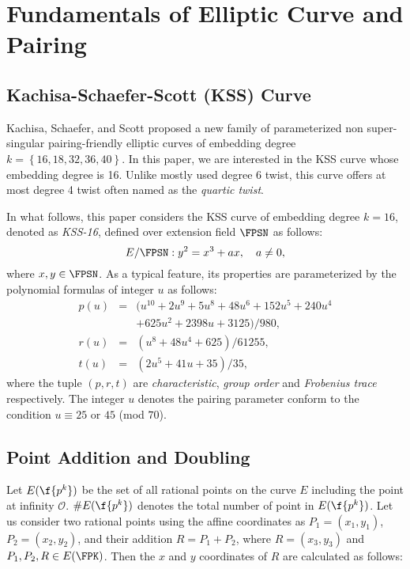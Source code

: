 \section{Fundamentals of Elliptic Curve and Pairing}\label{sec:1}
\subsection{Kachisa-Schaefer-Scott (KSS) Curve \cite{kss}}
Kachisa, Schaefer, and Scott proposed a new family of  parameterized non super-singular pairing-friendly elliptic curves of embedding degree $k = \left\lbrace 16, 18, 32, 36, 40\right\rbrace$.
In this paper, we are interested in the KSS curve whose embedding degree is 16. 
Unlike mostly used degree 6 twist, this curve offers at most degree 4 twist often named as the \textit{quartic twist}.

In what follows, this paper considers  the KSS curve of embedding degree $k =16$, denoted as \textit{KSS-16}, defined over extension field $\FPSN$ as follows:
\begin{equation}\label{eq:KSS_16}
E/\FPSN:y^2=x^3+ax, \quad \mbox{$a \neq 0$},
\end{equation}
where $x,y \in \FPSN$. 
As a typical feature, its properties are parameterized by the polynomial formulas of integer $u$ as follows:
\begin{subequations}
	\begin{eqnarray}
	p(u) &= & (u^{10} +2u^9 +5u^8 +48u^6 +152u^5 +240u^4   \nonumber \\ 
	&& +625u^2 +2398u +3125)/980,  \\\label{eq:kss_16_char}
	r(u) &= & (u^8 +48u^4 +625)/61255, \label{eq:kss_16_degree}  \\
	t(u) &=& (2u^5 +41u+35)/35, \label{eq:kss_16_trace} 
	\end{eqnarray}
\end{subequations} 
where the tuple $(p,r,t)$ are \textit{characteristic}, \textit{group order} and \textit{Frobenius trace} respectively.
The integer  $u$  denotes the pairing parameter conform to the condition $u \equiv 25$ or $45$ (mod $70$). 

\subsection{Point Addition and Doubling}
Let $E(\f{p^k})$ be the set of all rational points on the curve $E$ including the point at infinity $\mathcal{O}$.
$\#E(\f{p^k})$ denotes the total number of point in $E(\f{p^k})$.
Let us consider two rational points using the affine coordinates as $P_1= (x_1, y_1)$, $P_2 = (x_2, y_2)$, and their addition $R = P_1 + P_2$, where $\textit{R} = (x_3, y_3)$ and $P_1, P_2, R \in E(\FPK)$. Then the $x$ and $y$ coordinates of $R$ are calculated as follows:

